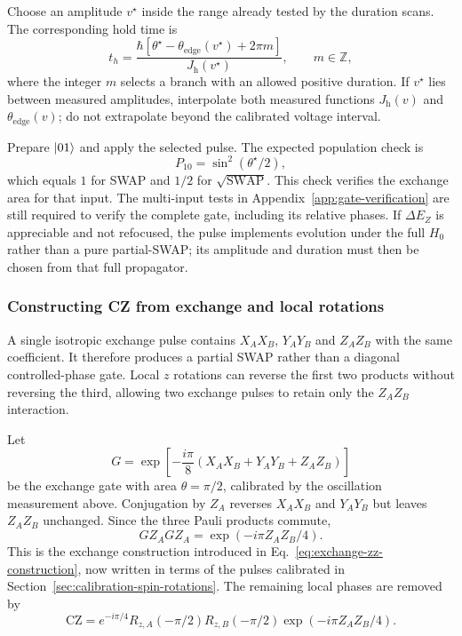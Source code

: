 Choose an amplitude $v^\star$ inside the range already tested by the
duration scans. The corresponding hold time is
\begin{equation}
 t_h=
 \frac{\hbar[
   \theta^\star-\theta_{\mathrm{edge}}(v^\star)+2\pi m]}
      {J_{\mathrm h}(v^\star)},
 \qquad m\in\mathbb Z,
 \label{eq:calibration-partial-swap-duration}
\end{equation}
where the integer $m$ selects a branch with an allowed positive
duration. If $v^\star$ lies between measured amplitudes, interpolate
both measured functions $J_{\mathrm h}(v)$ and
$\theta_{\mathrm{edge}}(v)$; do not extrapolate beyond the calibrated
voltage interval.

Prepare $\lvert 01\rangle$ and apply the selected pulse. The expected
population check is
\[
 P_{10}=\sin^2(\theta^\star/2),
\]
which equals $1$ for SWAP and $1/2$ for $\sqrt{\mathrm{SWAP}}$.
This check verifies the exchange area for that input. The
multi-input tests in Appendix~\ref{app:gate-verification}
are still required to verify the complete gate, including its
relative phases. If $\Delta E_Z$ is appreciable and not refocused,
the pulse implements evolution under the full $H_0$ rather than a
pure partial-SWAP; its amplitude and duration must then be chosen
from that full propagator.


\subsubsection{Constructing CZ from exchange and local rotations}
\label{sec:calibration-single-spin-exchange-cz}

A single isotropic exchange pulse contains
$X_AX_B$, $Y_AY_B$ and $Z_AZ_B$ with the same coefficient. It
therefore produces a partial SWAP rather than a diagonal
controlled-phase gate. Local $z$ rotations can reverse the first
two products without reversing the third, allowing two exchange
pulses to retain only the $Z_AZ_B$ interaction.

Let
\[
 G=\exp\!\left[-\frac{i\pi}{8}
  (X_AX_B+Y_AY_B+Z_AZ_B)\right]
\]
be the exchange gate with area $\theta=\pi/2$, calibrated by the
oscillation measurement above. Conjugation by $Z_A$ reverses
$X_AX_B$ and $Y_AY_B$ but leaves $Z_AZ_B$ unchanged. Since the
three Pauli products commute,
\begin{equation}
 GZ_AGZ_A=\exp(-i\pi Z_AZ_B/4).
 \label{eq:calibration-exchange-zz-repeated}
\end{equation}
This is the exchange construction introduced in
Eq.~\eqref{eq:exchange-zz-construction}, now written in terms of
the pulses calibrated in
Section~\ref{sec:calibration-spin-rotations}. The remaining local phases
are removed by
\begin{equation}
 \mathrm{CZ}
 =e^{-i\pi/4}R_{z,A}(-\pi/2)R_{z,B}(-\pi/2)
       \exp(-i\pi Z_AZ_B/4).
 \label{eq:calibration-single-spin-cz}
\end{equation}

